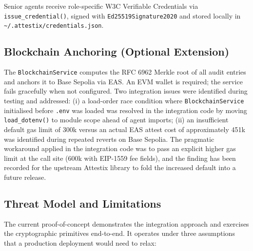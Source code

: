 Senior agents receive role-specific W3C Verifiable Credentials via \texttt{issue\_credential()}, signed with \texttt{Ed25519Signature2020} and stored locally in \texttt{\textasciitilde/.attestix/credentials.json}.

\subsection{Blockchain Anchoring (Optional Extension)}
\label{sec:blockchain}

The \texttt{BlockchainService} computes the RFC 6962 Merkle root of all audit entries and anchors it to Base Sepolia via EAS. An EVM wallet is required; the service fails gracefully when not configured. Two integration issues were identified during testing and addressed: (i) a load-order race condition where \texttt{BlockchainService} initialised before \texttt{.env} was loaded was resolved in the integration code by moving \texttt{load\_dotenv()} to module scope ahead of agent imports; (ii) an insufficient default gas limit of 300k versus an actual EAS attest cost of approximately 451k was identified during repeated reverts on Base Sepolia. The pragmatic workaround applied in the integration code was to pass an explicit higher gas limit at the call site (600k with EIP-1559 fee fields), and the finding has been recorded for the upstream Attestix library to fold the increased default into a future release.

\subsection{Threat Model and Limitations}
\label{sec:limitations}

The current proof-of-concept demonstrates the integration approach and exercises the cryptographic primitives end-to-end. It operates under three assumptions that a production deployment would need to relax:


